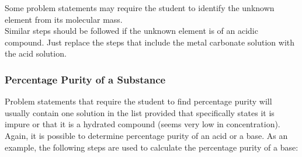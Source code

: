 Some problem statements may require the student to identify the unknown element from its molecular mass.\\
Similar steps should be followed if the unknown element is of an acidic compound. Just replace the steps that include the metal carbonate solution with the acid solution.


\subsubsection{Percentage Purity of a Substance}

Problem statements that require the student to find percentage purity will usually contain one solution in the list provided that specifically states it is impure or that it is a hydrated compound (seems very low in concentration). Again, it is possible to determine percentage purity of an acid or a base. As an example, the following steps are used to calculate the percentage purity of a base:

